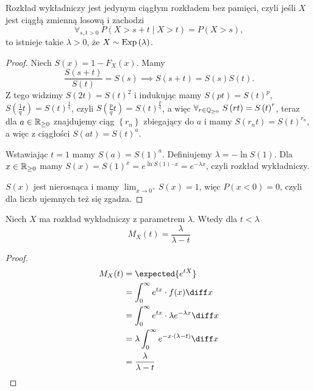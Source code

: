 \begin{theorem}
    Rozkład wykładniczy jest jedynym ciągłym rozkładem bez pamięci, czyli jeśli $X$ jest ciągłą zmienną losową i zachodzi
    $$ \forall_{s,t>0} \ P\left( X> s+t \mid X>t \right) = P\left( X >s \right) ,  $$ 
    to istnieje takie $\lambda > 0$, że $X \sim \operatorname{Exp}\left( \lambda \right) $.
\end{theorem}
\begin{proof}
    Niech $S\left( x  \right) = 1 - F_X\left( x  \right) $. Mamy 
    $$ \frac{S\left( s+t \right) }{S\left( t \right) } = S\left( s  \right) \implies  S\left( s+t \right) = S\left( s  \right) S\left( t  \right) . $$ 
    Z tego widzimy $S \left( 2t \right) = S\left( t \right)^2 $ i indukując mamy $S\left( p t  \right) = S\left( t  \right) ^{p}$, $ S\left( \frac{1}{q}t \right) = S\left( t  \right) ^{\frac{1}{q}} $, czyli $S\left( \frac{p}{q}t \right) = S\left( t  \right) ^{\frac{p}{q}}$, a więc $\forall_{r \in \mathbb{Q}_{\ge 0}} \ S\left( rt \right) = S\left( t  \right) ^{r} $, teraz dla $a\in \mathbb{R}_{\ge 0}$ znajdujemy ciąg $\left\{ r_n \right\} $ zbiegający do $a$ i mamy $S\left( r_n t  \right) = S\left( t  \right) ^{r_n}$, a więc z ciągłości $S\left( at  \right) = S\left( t  \right) ^{a}$.

    Wstawiając $t=1$ mamy $S\left( a  \right) = S\left( 1 \right) ^{a}$. Definiujemy $\lambda = -\ln S\left( 1 \right) $. Dla $x \in \mathbb{R}_{\ge 0}$ mamy $S\left( x  \right) = S\left( 1 \right) ^{x} = e^{\ln S\left( 1 \right) \cdot  x } = e^{-\lambda x}$, czyli rozkład wykładniczy.

    $S\left( x  \right) $ jest nierosnąca i mamy $ \lim_{x \to 0^{+}} S\left( x  \right) = 1$, więc $P\left( x < 0 \right) = 0$, czyli dla liczb ujemnych też się zgadza.
\end{proof}


\begin{theorem}[MGF] 
    Niech \( X \) ma rozkład wykładniczy z parametrem \( \lambda \). Wtedy dla \( t < \lambda \)
    \[
        M_X(t) = \frac{\lambda}{\lambda - t}
    \]
\end{theorem}
\begin{proof}
    \begin{align*}
        M_X(t) 
            &= \expected{e^{tX}} \\
            &= \int_0^\infty e^{tx} \cdot f(x) \diff x\\
            &= \int_0^\infty e^{tx} \cdot \lambda e^{-\lambda x} \diff x \\
            &= \lambda \int_0^\infty e^{-x \cdot (\lambda - t)} \diff x \\
            &= \frac{\lambda}{\lambda - t}
    \end{align*}
\end{proof}

